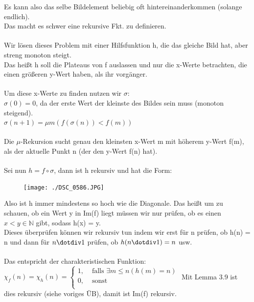 \documentclass[a4paper]{scrartcl}%
\begin{document}
\begin{itemize}
\begin{itemize}
                    Es kann also das selbe Bildelement beliebig oft hintereinanderkommen (solange endlich).\\
                    Das macht es schwer eine rekursive Fkt. zu definieren.\\
                    \\Wir lösen dieses Problem mit einer Hilfsfunktion h, die das gleiche Bild hat, aber streng monoton steigt.\\
                    Das heißt h soll die Plateaus von f auslassen und nur die x-Werte betrachten, die einen größeren y-Wert haben, als ihr vorgänger.\\
                    \\Um diese x-Werte zu finden nutzen wir $\sigma$:\\
                    $\sigma(0) = 0$, da der erste Wert der kleinste des Bildes sein muss (monoton steigend).\\
                    $\sigma(n+1) = \mu m (f(\sigma(n))< f(m))$\\
                    \\Die $\mu$-Rekursion sucht genau den kleinsten x-Wert m mit höherem y-Wert f(m), als der aktuelle Punkt n (der den y-Wert f(n) hat).\\
                    \\Sei nun $h = f \circ \sigma$, dann ist h rekursiv und hat die Form:\\
                    \begin{figure}[H]
                        \centering
                        \texttt{[image: ./DSC\_0586.JPG]}
                        \label{fig:./DSC_0586}
                    \end{figure}
                    Also ist h immer mindestens so hoch  wie die Diagonale. Das heißt um zu schauen, ob ein Wert y in Im(f) liegt müssen wir nur prüfen, ob es einen
                    $x<y \in \mathds{N}$ gibt, sodass h(x) = y.\\
                    Dieses überprüfen können wir rekursiv tun indem wir erst für n prüfen, ob h(n) = n und dann für $n \dotdiv 1$ prüfen, ob $h(n \dotdiv 1) = n$ usw.\\
                    \\Das entspricht der charakteristischen Funktion:\\
                    $\chi_f(n) = \chi_h(n) = \begin{cases}
                        1, &\text{ falls }\exists m \leq n (h(m) = n)\\
                        0, &\text{ sonst }\\
                    \end{cases}$
                    Mit Lemma 3.9 ist dies rekursiv (siehe voriges ÜB), damit ist Im(f) rekursiv.\\
            \end{itemize}


\end{itemize}
\end{document}
